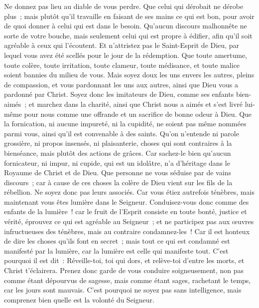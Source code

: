 \begin{multicols}{2}
Ne donnez pas lieu au diable de vous perdre.
Que celui qui dérobait ne dérobe plus~; mais plutôt qu'il travaille en faisant de ses mains ce qui est bon, pour avoir de quoi donner à celui qui est dans le besoin.
Qu'aucun discours malhonnête ne sorte de votre bouche, mais seulement celui qui est propre à édifier, afin qu'il soit agréable à ceux qui l'écoutent.
Et n'attristez pas le Saint-Esprit de Dieu, par lequel vous avez été scellés pour le jour de la rédemption.
Que toute amertume, toute colère, toute irritation, toute clameur, toute médisance, et toute malice soient bannies du milieu de vous.
Mais soyez doux les uns envers les autres, pleins de compassion, et vous pardonnant les uns aux autres, ainsi que Dieu vous a pardonné par Christ.
\VerseOne{}Soyez donc les imitateurs de Dieu, comme ses enfants bien-aimés~;
et marchez dans la charité, ainsi que Christ nous a aimés et s'est livré lui-même pour nous comme une offrande et un sacrifice de bonne odeur à Dieu.
Que la fornication, ni aucune impureté, ni la cupidité, ne soient pas même nommées parmi vous, ainsi qu'il est convenable à des saints.
Qu'on n'entende ni parole grossière, ni propos insensés, ni plaisanterie, choses qui sont contraires à la bienséance, mais plutôt des actions de grâces.
Car sachez-le bien qu'aucun fornicateur, ni impur, ni cupide, qui est un idolâtre, n'a d'héritage dans le Royaume de Christ et de Dieu.
Que personne ne vous séduise par de vains discours~; car à cause de ces choses la colère de Dieu vient sur les fils de la rébellion.
Ne soyez donc pas leurs associés.
Car vous étiez autrefois ténèbres, mais maintenant vous êtes lumière dans le Seigneur. Conduisez-vous donc comme des enfants de la lumière~!
car le fruit de l'Esprit consiste en toute bonté, justice et vérité,
éprouvez ce qui est agréable au Seigneur~;
et ne participez pas aux œuvres infructueuses des ténèbres, mais au contraire condamnez-les~!
Car il est honteux de dire les choses qu'ils font en secret~;
mais tout ce qui est condamné est manifesté par la lumière, car la lumière est celle qui manifeste tout.
C'est pourquoi il est dit~: Réveille-toi, toi qui dors, et relève-toi d'entre les morts, et Christ t'éclairera.
Prenez donc garde de vous conduire soigneusement, non pas comme étant dépourvus de sagesse, mais comme étant sages,
rachetant le temps, car les jours sont mauvais.
C'est pourquoi ne soyez pas sans intelligence, mais comprenez bien quelle est la volonté du Seigneur.

\end{multicols}
